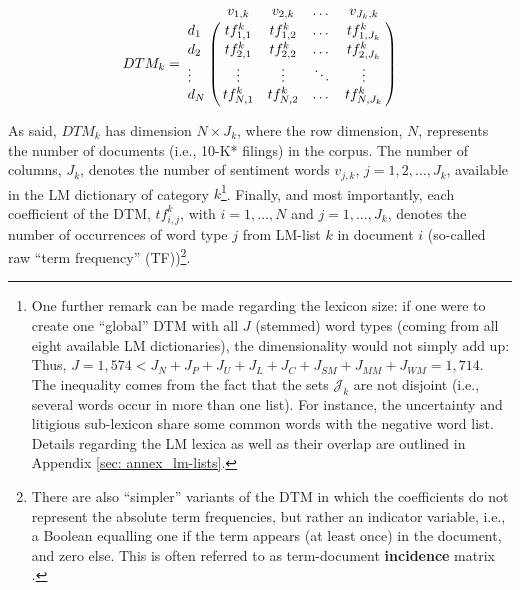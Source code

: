 \begin{equation}
DTM_k = 
\bordermatrix{
  & v_{1,k}	& v_{2,k}   & \dots   & v_{J_{k},k} \cr
d_1 & tf_{1,1}^{k} & tf_{1,2}^{k} & \dots & tf_{1,J_{k}}^{k} \cr
d_2 & tf_{2,1}^{k} & tf_{2,2}^{k} & \dots & tf_{2,J_{k}}^{k} \cr
\vdots & \vdots & \vdots & \ddots & \vdots \cr
d_N & tf_{N,1}^{k} & tf_{N,2}^{k} & \dots & tf_{N,J_{k}}^{k} \cr
}
\end{equation}

As said, $DTM_k$ has dimension $N \times J_k$, where the row dimension, $N$, represents the number of documents (i.e., 10-K* filings) in the corpus. The number of columns, $J_k$, denotes the number of sentiment words $v_{j,k}$, $j = 1, 2, \dots, J_{k}$, available in the LM dictionary of category $k$\footnote{One further remark can be made regarding the lexicon size: if one were to create one \enquote{global} DTM with all $J$ (stemmed) word types (coming from all eight available LM dictionaries), the dimensionality would not simply add up: Thus, $J = 1,574 < J_N + J_P + J_U + J_L + J_C + J_{SM} + J_{MM} + J_{WM} = 1,714$. The inequality comes from the fact that the sets $\mathcal{J}_k$ are not disjoint (i.e., several words occur in more than one list). For instance, the uncertainty and litigious sub-lexicon share some common words with the negative word list. Details regarding the LM lexica as well as their overlap are outlined in Appendix \ref{sec: annex_lm-lists}.}. Finally, and most importantly, each coefficient of the DTM, $tf_{i,j}^{k}$, with $i = 1, \dots, N$ and $j = 1, \dots, J_k$, denotes the number of occurrences of word type $j$ from LM-list $k$ in document $i$ (so-called raw \enquote{term frequency} (TF))\footnote{\label{fn: td_incidence_mat}There are also \enquote{simpler} variants of the DTM in which the coefficients do not represent the absolute term frequencies, but rather an indicator variable, i.e., a Boolean equalling one if the term appears (at least once) in the document, and zero else. This is often referred to as term-document \textbf{incidence} matrix \parencite[4]{ManningSchutze_IR_2008}.}. 


